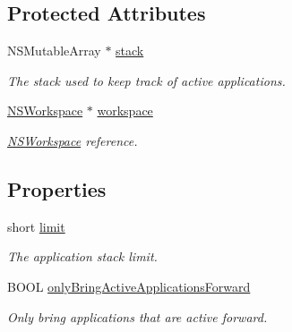 \subsection*{Protected Attributes}
\begin{DoxyCompactItemize}
\item 
\hypertarget{interface_g_d_active_application_stack_a6461f1d93e707a9d3ac8c777f81f7ff5}{
NSMutableArray $\ast$ \hyperlink{interface_g_d_active_application_stack_a6461f1d93e707a9d3ac8c777f81f7ff5}{stack}}
\label{interface_g_d_active_application_stack_a6461f1d93e707a9d3ac8c777f81f7ff5}

\begin{DoxyCompactList}\small\item\em The stack used to keep track of active applications. \item\end{DoxyCompactList}\item 
\hypertarget{interface_g_d_active_application_stack_a89a029b69eb31e0575e9148542f897cb}{
\hyperlink{class_n_s_workspace}{NSWorkspace} $\ast$ \hyperlink{interface_g_d_active_application_stack_a89a029b69eb31e0575e9148542f897cb}{workspace}}
\label{interface_g_d_active_application_stack_a89a029b69eb31e0575e9148542f897cb}

\begin{DoxyCompactList}\small\item\em \hyperlink{class_n_s_workspace}{NSWorkspace} reference. \item\end{DoxyCompactList}\end{DoxyCompactItemize}
\subsection*{Properties}
\begin{DoxyCompactItemize}
\item 
\hypertarget{interface_g_d_active_application_stack_a1e2c66f799b40713777d4e0ce37821d4}{
short \hyperlink{interface_g_d_active_application_stack_a1e2c66f799b40713777d4e0ce37821d4}{limit}}
\label{interface_g_d_active_application_stack_a1e2c66f799b40713777d4e0ce37821d4}

\begin{DoxyCompactList}\small\item\em The application stack limit. \item\end{DoxyCompactList}\item 
BOOL \hyperlink{interface_g_d_active_application_stack_a5714844d3e17a156cca14b1f383b3dbe}{onlyBringActiveApplicationsForward}
\begin{DoxyCompactList}\small\item\em Only bring applications that are active forward. \item\end{DoxyCompactList}\end{DoxyCompactItemize}


